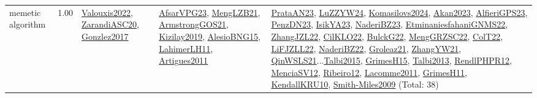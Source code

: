 {\begin{longtable}{p{3cm}r>{\raggedright\arraybackslash}p{6cm}>{\raggedright\arraybackslash}p{6cm}>{\raggedright\arraybackslash}p{8cm}}
\index{memetic algorithm}\index{Algorithms!memetic algorithm}memetic algorithm &  1.00 & \hyperref[detail:Valouxis2022]{Valouxis2022}, \hyperref[detail:ZarandiASC20]{ZarandiASC20}, \hyperref[detail:Gonzlez2017]{Gonzlez2017} & \hyperref[detail:AfsarVPG23]{AfsarVPG23}, \hyperref[detail:MengLZB21]{MengLZB21}, \hyperref[detail:ArmstrongGOS21]{ArmstrongGOS21}, \hyperref[detail:Kizilay2019]{Kizilay2019}, \hyperref[detail:AlesioBNG15]{AlesioBNG15}, \hyperref[detail:LahimerLH11]{LahimerLH11}, \hyperref[detail:Artigues2011]{Artigues2011} & \hyperref[detail:PrataAN23]{PrataAN23}, \hyperref[detail:LuZZYW24]{LuZZYW24}, \hyperref[detail:Komasilovs2024]{Komasilovs2024}, \hyperref[detail:Akan2023]{Akan2023}, \hyperref[detail:AlfieriGPS23]{AlfieriGPS23}, \hyperref[detail:PenzDN23]{PenzDN23}, \hyperref[detail:IsikYA23]{IsikYA23}, \hyperref[detail:NaderiBZ23]{NaderiBZ23}, \hyperref[detail:EtminaniesfahaniGNMS22]{EtminaniesfahaniGNMS22}, \hyperref[detail:ZhangJZL22]{ZhangJZL22}, \hyperref[detail:CilKLO22]{CilKLO22}, \hyperref[detail:BulckG22]{BulckG22}, \hyperref[detail:MengGRZSC22]{MengGRZSC22}, \hyperref[detail:ColT22]{ColT22}, \hyperref[detail:LiFJZLL22]{LiFJZLL22}, \hyperref[detail:NaderiBZ22]{NaderiBZ22}, \hyperref[detail:Groleaz21]{Groleaz21}, \hyperref[detail:ZhangYW21]{ZhangYW21}, \hyperref[detail:QinWSLS21]{QinWSLS21}...\hyperref[detail:Talbi2015]{Talbi2015}, \hyperref[detail:GrimesH15]{GrimesH15}, \hyperref[detail:Talbi2013]{Talbi2013}, \hyperref[detail:RendlPHPR12]{RendlPHPR12}, \hyperref[detail:MenciaSV12]{MenciaSV12}, \hyperref[detail:Ribeiro12]{Ribeiro12}, \hyperref[detail:Lacomme2011]{Lacomme2011}, \hyperref[detail:GrimesH11]{GrimesH11}, \hyperref[detail:KendallKRU10]{KendallKRU10}, \hyperref[detail:Smith-Miles2009]{Smith-Miles2009} (Total: 38)\\

\end{longtable}}
